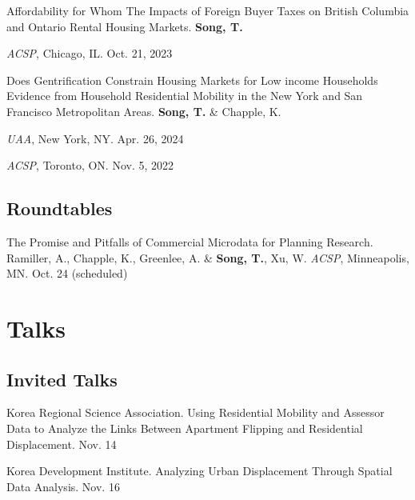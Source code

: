 \documentclass[11pt,letterpaper]{article}
\newcommand{\listitemspace}{0.25em}
\renewenvironment{itemize}
{\begin{list}{}{\setlength{\leftmargin}{1em}
\setlength{\parskip}{0em}
\setlength{\itemsep}{\listitemspace}
\setlength{\parsep}{\listitemspace}}}
{\end{list}}
\newcommand{\term}[1]{(#1)}     %
\begin{document}
\begin{itemize}
  \item Affordability for Whom The Impacts of Foreign Buyer Taxes on British Columbia and Ontario Rental Housing Markets. \textbf{Song, T.}
    \begin{itemize}
      \addtolength{\leftskip}{1em}\setlength{\itemsep}{-0.4em}
      \item[•] \emph{ACSP}, Chicago, IL. Oct. 21, 2023
    \end{itemize}

  \item Does Gentrification Constrain Housing Markets for Low income Households Evidence from Household Residential Mobility in the New York and San Francisco Metropolitan Areas. \textbf{Song, T.} \& Chapple, K.
    \begin{itemize}
      \addtolength{\leftskip}{1em}\setlength{\itemsep}{-0.4em}
      \item[•] \emph{UAA}, New York, NY. Apr. 26, 2024
      \item[•] \emph{ACSP}, Toronto, ON. Nov. 5, 2022
    \end{itemize}
\end{itemize}

\subsection{Roundtables}
\begin{tablist}
  \item[2025] \tab{}The Promise and Pitfalls of Commercial Microdata for Planning Research. Ramiller, A., Chapple, K., Greenlee, A. \& \textbf{Song, T.}, Xu, W. \emph{ACSP}, Minneapolis, MN. Oct. 24 \term{scheduled}
\end{tablist}

\section{Talks}

\subsection{Invited Talks}
\begin{tablist}
  \item[2024] \tab{}Korea Regional Science Association. Using Residential Mobility and Assessor Data to Analyze the Links Between Apartment Flipping and Residential Displacement. Nov. 14
  \item[2022] \tab{}Korea Development Institute. Analyzing Urban Displacement Through Spatial Data Analysis. Nov. 16
\end{tablist}
\end{document}
